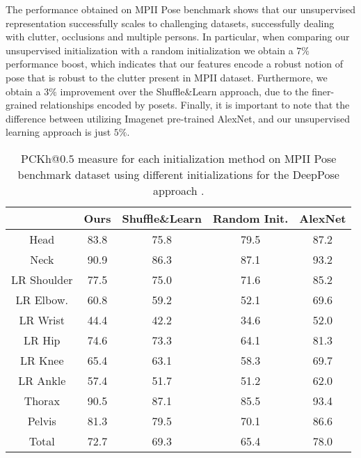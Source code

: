 \documentclass[10pt,twocolumn,letterpaper]{article}
\begin{document}
The performance obtained on MPII Pose benchmark shows that our unsupervised representation successfully scales to challenging datasets, successfully dealing with clutter, occlusions and multiple persons. In particular, when comparing our unsupervised initialization with a random initialization we obtain a $7\%$ performance boost, which indicates that our features encode a robust notion of pose that is robust to the clutter present in MPII dataset. Furthermore, we obtain a $3\% $ improvement over the  Shuffle\&Learn \cite{shuffleandlearn} approach, due to the finer-grained relationships encoded by posets. Finally, it is important to note that the difference between utilizing Imagenet pre-trained AlexNet\cite{alexnet}, and our unsupervised learning approach is just $5\%$.

\begin{table}[!t]
    \scriptsize
    \centering
    \begin{tabular}{|c|c|c|c||c|}
    \hline
    & Ours & Shuffle\&Learn \cite{shuffleandlearn} &  Random Init.  & AlexNet\cite{alexnet} \\
    \hline
    Head & 83.8 & 75.8 & 79.5 & 87.2 \\
    \hline
    Neck  & 90.9 & 86.3 & 87.1 & 93.2 \\
    \hline
    LR Shoulder & 77.5 & 75.0 & 71.6 & 85.2\\
    \hline
    LR Elbow. & 60.8 & 59.2 & 52.1 & 69.6\\
    \hline
    LR Wrist  & 44.4 & 42.2 & 34.6 & 52.0\\
    \hline
    LR Hip & 74.6 & 73.3 & 64.1 & 81.3\\
    \hline
    LR Knee & 65.4 & 63.1 & 58.3 & 69.7\\
    \hline
    LR Ankle & 57.4 & 51.7 & 51.2 & 62.0\\
    \hline
    Thorax & 90.5 & 87.1 & 85.5 & 93.4\\
    \hline
    Pelvis & 81.3 & 79.5 & 70.1 & 86.6\\
    \hline
    \hline
    Total & 72.7 & 69.3 & 65.4 & 78.0 \\
    \hline
    \end{tabular}
    \caption{PCKh@$0.5$ measure for each initialization method on MPII Pose benchmark dataset using different initializations for the DeepPose approach \cite{deeppose}.}
    \label{tab:results_mpii_deeppose}
\end{table}
\end{document}
